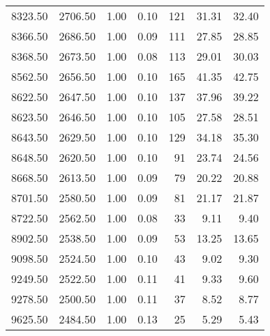 \begin{table}
\begin{tabular}{rrrrrrr}
8323.50 & 2706.50 & 1.00 & 0.10 & 121 & 31.31 & 32.40 \\
8366.50 & 2686.50 & 1.00 & 0.09 & 111 & 27.85 & 28.85 \\
8368.50 & 2673.50 & 1.00 & 0.08 & 113 & 29.01 & 30.03 \\
8562.50 & 2656.50 & 1.00 & 0.10 & 165 & 41.35 & 42.75 \\
8622.50 & 2647.50 & 1.00 & 0.10 & 137 & 37.96 & 39.22 \\
8623.50 & 2646.50 & 1.00 & 0.10 & 105 & 27.58 & 28.51 \\
8643.50 & 2629.50 & 1.00 & 0.10 & 129 & 34.18 & 35.30 \\
8648.50 & 2620.50 & 1.00 & 0.10 & 91 & 23.74 & 24.56 \\
8668.50 & 2613.50 & 1.00 & 0.09 & 79 & 20.22 & 20.88 \\
8701.50 & 2580.50 & 1.00 & 0.09 & 81 & 21.17 & 21.87 \\
8722.50 & 2562.50 & 1.00 & 0.08 & 33 & 9.11 & 9.40 \\
8902.50 & 2538.50 & 1.00 & 0.09 & 53 & 13.25 & 13.65 \\
9098.50 & 2524.50 & 1.00 & 0.10 & 43 & 9.02 & 9.30 \\
9249.50 & 2522.50 & 1.00 & 0.11 & 41 & 9.33 & 9.60 \\
9278.50 & 2500.50 & 1.00 & 0.11 & 37 & 8.52 & 8.77 \\
9625.50 & 2484.50 & 1.00 & 0.13 & 25 & 5.29 & 5.43 \\
\bottomrule
\end{tabular}
\end{table}
